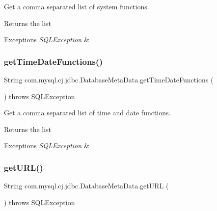 Get a comma separated list of system functions.

\begin{DoxyReturn}{Returns}
the list 
\end{DoxyReturn}

\begin{DoxyExceptions}{Exceptions}
{\em S\+Q\+L\+Exception} & \\
\hline
\end{DoxyExceptions}
\mbox{\label{classcom_1_1mysql_1_1cj_1_1jdbc_1_1_database_meta_data_a8237f7df21503f6c3eeda4a98997aad3}} 
\subsubsection{\texorpdfstring{get\+Time\+Date\+Functions()}{getTimeDateFunctions()}}
{\footnotesize\ttfamily String com.\+mysql.\+cj.\+jdbc.\+Database\+Meta\+Data.\+get\+Time\+Date\+Functions (\begin{DoxyParamCaption}{ }\end{DoxyParamCaption}) throws S\+Q\+L\+Exception}

Get a comma separated list of time and date functions.

\begin{DoxyReturn}{Returns}
the list 
\end{DoxyReturn}

\begin{DoxyExceptions}{Exceptions}
{\em S\+Q\+L\+Exception} & \\
\hline
\end{DoxyExceptions}
\mbox{\label{classcom_1_1mysql_1_1cj_1_1jdbc_1_1_database_meta_data_a2a8e539e06d048726861836dd282cd27}} 
\subsubsection{\texorpdfstring{get\+U\+R\+L()}{getURL()}}
{\footnotesize\ttfamily String com.\+mysql.\+cj.\+jdbc.\+Database\+Meta\+Data.\+get\+U\+RL (\begin{DoxyParamCaption}{ }\end{DoxyParamCaption}) throws S\+Q\+L\+Exception}

